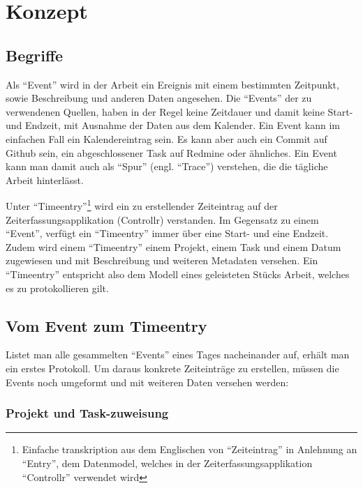 \documentclass[]{article}
\begin{document}
\newpage

\section{Konzept}\label{konzept}

\subsection{Begriffe}\label{begriffe}

\begin{description}
\itemsep1pt\parskip0pt
\item[Event]
Als ``Event'' wird in der Arbeit ein Ereignis mit einem bestimmten
Zeitpunkt, sowie Beschreibung und anderen Daten angesehen. Die
``Events'' der zu verwendenen Quellen, haben in der Regel keine
Zeitdauer und damit keine Start- und Endzeit, mit Ausnahme der Daten aus
dem Kalender. Ein Event kann im einfachen Fall ein Kalendereintrag sein.
Es kann aber auch ein Commit auf Github sein, ein abgeschlossener Task
auf Redmine oder ähnliches. Ein Event kann man damit auch als ``Spur''
(engl. ``Trace'') verstehen, die die tägliche Arbeit hinterlässt.
\item[Timeentry]
Unter ``Timeentry''\footnote{Einfache transkription aus dem Englischen
  von ``Zeiteintrag'' in Anlehnung an ``Entry'', dem Datenmodel, welches
  in der Zeiterfassungsapplikation ``Controllr'' verwendet wird} wird
ein zu erstellender Zeiteintrag auf der Zeiterfassungsapplikation
(Controllr) verstanden. Im Gegensatz zu einem ``Event'', verfügt ein
``Timeentry'' immer über eine Start- und eine Endzeit. Zudem wird einem
``Timeentry'' einem Projekt, einem Task und einem Datum zugewiesen und
mit Beschreibung und weiteren Metadaten versehen. Ein ``Timeentry''
entspricht also dem Modell eines geleisteten Stücks Arbeit, welches es
zu protokollieren gilt.
\end{description}

\subsection{Vom Event zum Timeentry}\label{vom-event-zum-timeentry}

Listet man alle gesammelten ``Events'' eines Tages nacheinander auf,
erhält man ein erstes Protokoll. Um daraus konkrete Zeiteinträge zu
erstellen, müssen die Events noch umgeformt und mit weiteren Daten
versehen werden:

\subsubsection{Projekt und
Task-zuweisung}\label{projekt-und-task-zuweisung}
\end{document}
